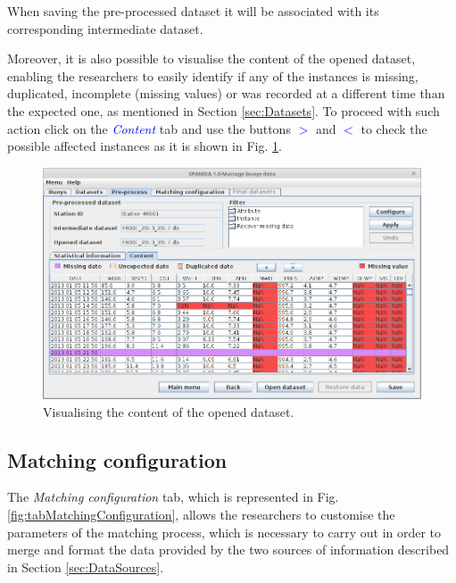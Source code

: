 \begin{onehalfspace}
				When saving the pre-processed dataset it will be associated with its corresponding intermediate dataset.

				Moreover, it is also possible to visualise the content of the opened dataset, enabling the researchers to easily identify if any of the instances is missing, duplicated, incomplete (missing values) or was recorded at a different time than the expected one, as mentioned in Section \ref{sec:Datasets}. To proceed with such action click on the \textcolor{blue}{\textit{Content}} tab and use the buttons \textcolor{blue}{\textit{$>$}} and \textcolor{blue}{\textit{$<$}} to check the possible affected instances as it is shown in Fig. \ref{fig:contentOpenedDataset}.
				
				\begin{figure}[ht!]
					\centering
					\includegraphics[scale=0.40]{figures/contentOpenedDataset.png}
					\caption{Visualising the content of the opened dataset.}
					\label{fig:contentOpenedDataset}
				\end{figure}
			
			\subsection{Matching configuration}\label{sec:MatchingConf}
			
				The \textit{Matching configuration} tab, which is represented in Fig. \ref{fig:tabMatchingConfiguration}, allows the researchers to customise the parameters of the matching process, which is necessary to carry out in order to merge and format the data provided by the two sources of information described in Section \ref{sec:DataSources}.
				

\end{onehalfspace}
